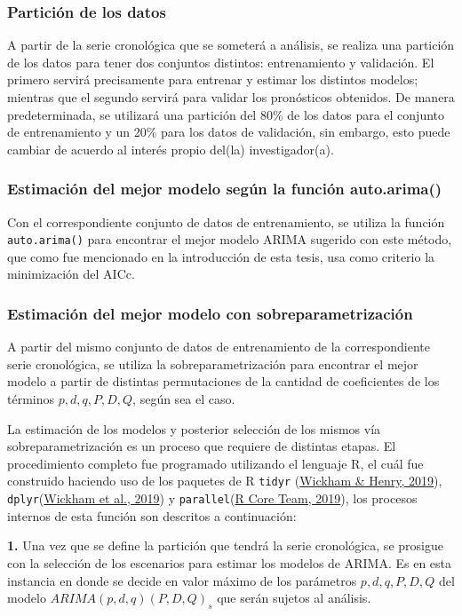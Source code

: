 \documentclass[
]{article}
\begin{document}
\subsubsection{Partición de los datos}

A partir de la serie cronológica que se someterá a análisis, se realiza
una partición de los datos para tener dos conjuntos distintos:
entrenamiento y validación. El primero servirá precisamente para
entrenar y estimar los distintos modelos; mientras que el segundo
servirá para validar los pronósticos obtenidos. De manera
predeterminada, se utilizará una partición del 80\% de los datos para el
conjunto de entrenamiento y un 20\% para los datos de validación, sin
embargo, esto puede cambiar de acuerdo al interés propio del(la)
investigador(a).

\subsubsection{Estimación del mejor modelo según la función auto.arima()}

Con el correspondiente conjunto de datos de entrenamiento, se utiliza la
función \texttt{auto.arima()} para encontrar el mejor modelo ARIMA
sugerido con este método, que como fue mencionado en la introducción de
esta tesis, usa como criterio la minimización del AICc.

\subsubsection{Estimación del mejor modelo con sobreparametrización}

A partir del mismo conjunto de datos de entrenamiento de la
correspondiente serie cronológica, se utiliza la sobreparametrización
para encontrar el mejor modelo a partir de distintas permutaciones de la
cantidad de coeficientes de los términos \(p,d,q, P,D,Q\), según sea el
caso.

La estimación de los modelos y posterior selección de los mismos vía
sobreparametrización es un proceso que requiere de distintas etapas. El
procedimiento completo fue programado utilizando el lenguaje R, el cuál
fue construido haciendo uso de los paquetes de R \texttt{tidyr}
(\protect\hyperlink{ref-tidyr}{Wickham \& Henry, 2019}),
\texttt{dplyr}(\protect\hyperlink{ref-dplyr}{Wickham et al., 2019}) y
\texttt{parallel}(\protect\hyperlink{ref-parallel}{R Core Team, 2019}),
los procesos internos de esta función son descritos a continuación:

\textbf{1.} Una vez que se define la partición que tendrá la serie
cronológica, se prosigue con la selección de los escenarios para estimar
los modelos de ARIMA. Es en esta instancia en donde se decide en valor
máximo de los parámetros \(p,d,q,P,D,Q\) del modelo
\(ARIMA(p,d,q)(P,D,Q)_s\) que serán sujetos al análisis.
\end{document}
